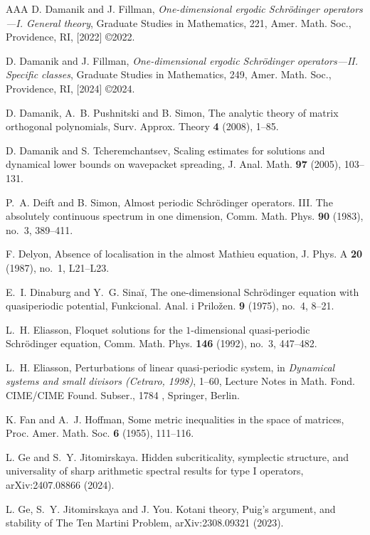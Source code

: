\documentclass[11pt]{amsart}
\theoremstyle{remark}
\theoremstyle{definition}
\begin{document}
\begin{thebibliography}{AAA}
D. Damanik and J. Fillman, {\it One-dimensional ergodic Schr\"odinger operators---I. General theory}, Graduate Studies in Mathematics, 221, Amer. Math. Soc., Providence, RI, [2022] \copyright 2022.

D. Damanik and J. Fillman, {\it One-dimensional ergodic Schr\"odinger operators---II. Specific classes}, Graduate Studies in Mathematics, 249, Amer. Math. Soc., Providence, RI, [2024] \copyright 2024.

D. Damanik, A.~B. Pushnitski and B. Simon, The analytic theory of matrix orthogonal polynomials, Surv. Approx. Theory {\bf 4} (2008), 1--85.


D. Damanik and S. Tcheremchantsev, Scaling estimates for solutions and dynamical lower bounds on wavepacket spreading, J. Anal. Math. {\bf 97} (2005), 103--131.



P.~A. Deift and B. Simon, Almost periodic Schr\"odinger operators. III. The absolutely continuous spectrum in one dimension, Comm. Math. Phys. {\bf 90} (1983), no.~3, 389--411.

F. Delyon, Absence of localisation in the almost Mathieu equation, J. Phys. A {\bf 20} (1987), no.~1, {\rm L}21--{\rm L}23.


E.~I. Dinaburg and Y.~G. Sina\u i, The one-dimensional Schr\"odinger equation with quasiperiodic potential, Funkcional. Anal. i Prilo\v zen. {\bf 9} (1975), no.~4, 8--21.


L.~H. Eliasson, Floquet solutions for the $1$-dimensional quasi-periodic Schr\"odinger equation, Comm. Math. Phys. {\bf 146} (1992), no.~3, 447--482.

L.~H. Eliasson, Perturbations of linear quasi-periodic system, in {\it Dynamical systems and small divisors (Cetraro, 1998)}, 1--60, Lecture Notes in Math. Fond. CIME/CIME Found. Subser., 1784 , Springer, Berlin.

K. Fan and A.~J. Hoffman, Some metric inequalities in the space of matrices, Proc. Amer. Math. Soc. {\bf 6} (1955), 111--116.

L. Ge and S.~Y. Jitomirskaya. Hidden subcriticality, symplectic structure, and universality of sharp arithmetic spectral results
for type I operators,  arXiv:2407.08866 (2024).

L. Ge, S.~Y. Jitomirskaya and J. You. Kotani theory, Puig's argument, and stability of The Ten Martini Problem,   arXiv:2308.09321 (2023).



\end{thebibliography}
\end{document}

